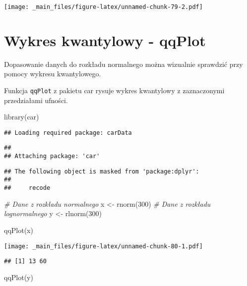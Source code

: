 \documentclass[
]{book}
\newenvironment{Shaded}{\begin{snugshade}}{\end{snugshade}}
\newcommand{\CommentTok}[1]{\textcolor[rgb]{0.56,0.35,0.01}{\textit{#1}}}
\newcommand{\DecValTok}[1]{\textcolor[rgb]{0.00,0.00,0.81}{#1}}
\newcommand{\FunctionTok}[1]{\textcolor[rgb]{0.00,0.00,0.00}{#1}}
\newcommand{\NormalTok}[1]{#1}
\newcommand{\OtherTok}[1]{\textcolor[rgb]{0.56,0.35,0.01}{#1}}
\begin{document}
\texttt{[image: \_main\_files/figure-latex/unnamed-chunk-79-2.pdf]}

\hypertarget{wykres-kwantylowy---qqplot}{%
\section{Wykres kwantylowy - qqPlot}\label{wykres-kwantylowy---qqplot}}

Dopasowanie danych do rozkładu normalnego można wizualnie sprawdzić przy pomocy wykresu kwantylowego.

Funkcja \texttt{qqPlot} z pakietu car rysuje wykres kwantylowy z zaznaczonymi przedziałami ufności.

\begin{Shaded}
\begin{Highlighting}[]
\FunctionTok{library}\NormalTok{(car)}
\end{Highlighting}
\end{Shaded}

\begin{verbatim}
## Loading required package: carData
\end{verbatim}

\begin{verbatim}
## 
## Attaching package: 'car'
\end{verbatim}

\begin{verbatim}
## The following object is masked from 'package:dplyr':
## 
##     recode
\end{verbatim}

\begin{Shaded}
\begin{Highlighting}[]
\CommentTok{\# Dane z rozkładu normalnego}
\NormalTok{x }\OtherTok{\textless{}{-}} \FunctionTok{rnorm}\NormalTok{(}\DecValTok{300}\NormalTok{)}
\CommentTok{\# Dane z rozkładu lognormalnego}
\NormalTok{y }\OtherTok{\textless{}{-}} \FunctionTok{rlnorm}\NormalTok{(}\DecValTok{300}\NormalTok{)}

\FunctionTok{qqPlot}\NormalTok{(x)}
\end{Highlighting}
\end{Shaded}

\texttt{[image: \_main\_files/figure-latex/unnamed-chunk-80-1.pdf]}

\begin{verbatim}
## [1] 13 60
\end{verbatim}

\begin{Shaded}
\begin{Highlighting}[]
\FunctionTok{qqPlot}\NormalTok{(y)}
\end{Highlighting}
\end{Shaded}
\end{document}
